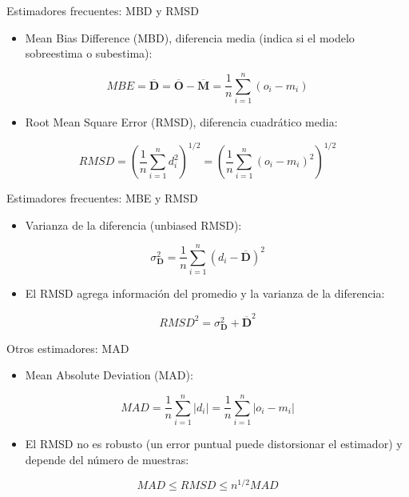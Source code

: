 \documentclass[xcolor={usenames,svgnames,dvipsnames}]{beamer}
\begin{document}
\begin{frame}[label=sec-7-4-2]{Estimadores frecuentes: MBD y RMSD}
\begin{itemize}
\item Mean Bias Difference (MBD), diferencia media (indica si el modelo sobreestima o subestima):
\end{itemize}
\[
MBE = \overline{\mathbf{D}} = \overline{\mathbf{O}} - \overline{\mathbf{M}} = \frac{1}{n} \sum_{i=1}^n (o_i - m_i)
\]
\pause
\begin{itemize}
\item Root Mean Square Error (RMSD), diferencia cuadrático media:
\end{itemize}
\[
RMSD = \left(\frac{1}{n} \sum_{i=1}^n d_i^2 \right)^{1/2} =  \left( \frac{1}{n} \sum_{i=1}^n (o_i - m_i)^2  \right)^{1/2}
\]
\end{frame}

\begin{frame}[label=sec-7-4-3]{Estimadores frecuentes: MBE y RMSD}
\begin{itemize}
\item Varianza de la diferencia (unbiased RMSD):
\end{itemize}
\[
\sigma^2_{\mathbf{D}} = \frac{1}{n} \sum_{i=1}^n (d_i - \overline{\mathbf{D}})^2
\]
\pause

\begin{itemize}
\item El RMSD agrega información del promedio y la varianza de la
diferencia:
\end{itemize}
\[
RMSD^2= \sigma^2_{\mathbf{D}} + \overline{\mathbf{D}}^2
\]
\end{frame}

\begin{frame}[label=sec-7-4-4]{Otros estimadores: MAD}
\begin{itemize}
\item Mean Absolute Deviation (MAD):
\end{itemize}

\[
MAD = \frac{1}{n} \sum_{i=1}^n \left|d_i\right| =  \frac{1}{n} \sum_{i=1}^n \left|o_i - m_i\right|
\]
\begin{itemize}
\item El RMSD no es robusto (un error puntual puede distorsionar el estimador) y depende del número de muestras:
\end{itemize}
\[
MAD \leq RMSD \leq n^{1/2} MAD
\]

\nocite{Willmott.Matsuura.ea2009, Willmott.Matsuura2005a}
\end{frame}
\end{document}

